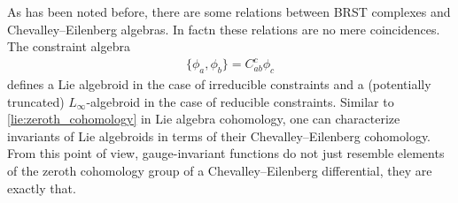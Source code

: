     \begin{remark}\label{constraint:remark_chevalley_eilenberg}
        As has been noted before, there are some relations between BRST complexes and Chevalley--Eilenberg algebras. In factn these relations are no mere coincidences. The constraint algebra
        \begin{gather}
            \{\phi_a,\phi_b\} = C^c_{ab}\phi_c
        \end{gather}
        defines a Lie algebroid in the case of irreducible constraints and a (potentially truncated) $L_\infty$-algebroid in the case of reducible constraints. Similar to \cref{lie:zeroth_cohomology} in Lie algebra cohomology, one can characterize invariants of Lie algebroids in terms of their Chevalley--Eilenberg cohomology. From this point of view, gauge-invariant functions do not just resemble elements of the zeroth cohomology group of a Chevalley--Eilenberg differential, they are exactly that.
    \end{remark}